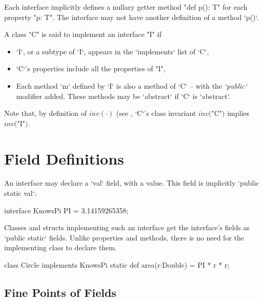Each interface implicitly defines a nullary getter method
\xcd"def p(): T" for each property \xcd"p: T". The interface may not have
another definition of a method \xcd`p()`. 



A class \xcd"C" is said to implement an interface \xcd"I" if
\begin{itemize}
\item \xcd`I`, or a subtype of \xcd`I`, appears in the \xcd`implements` list
      of \xcd`C`, 
\item \xcd`C`'s properties include all the properties of \xcd"I",
\item Each method \xcd`m` defined by \xcd`I` is also a method of \xcd`C` --
      with the {\em  \xcd`public`} modifier added.   These methods may be
      \xcd`abstract` if \xcd`C` is \xcd`abstract`.
\end{itemize}

Note that, by definition of $\mathit{inv}(\cdot)$ (see , \xcd`C`'s class invariant $\mathit{inv}($\xcd"C"$)$ implies
$\mathit{inv}($\xcd"I"$)$.

\section{Field Definitions}

An interface may declare a \xcd`val` field, with a value.  This field is implicitly
\xcd`public static val`: 
\begin{xten}
interface KnowsPi {
  PI = 3.14159265358;
}
\end{xten}
%

Classes and structs implementing such an interface get the interface's fields as
\xcd`public static` fields.  Unlike properties and methods, there is no need
for the implementing class to declare them. 
\begin{xten}
class Circle implements KnowsPi {
  static def area(r:Double) = PI * r * r;
}
\end{xten}
%

\subsection{Fine Points of Fields}


